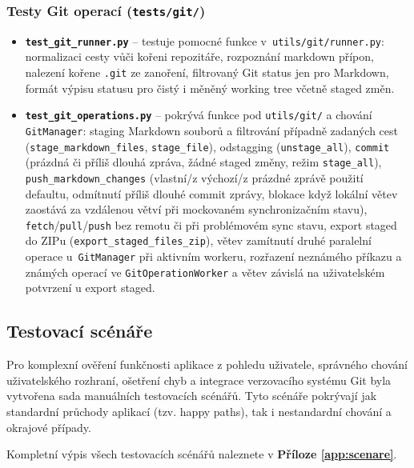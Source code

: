 \documentclass[12pt, a4paper]{article}
\begin{document}
\subsubsection*{Testy Git operací (\texttt{tests/git/})}

\begin{itemize}
    \item \textbf{\texttt{test\_git\_runner.py}} --
    testuje pomocné funkce v~\texttt{utils/git/runner.py}: normalizaci cesty vůči kořeni repozitáře,
    rozpoznání markdown přípon, nalezení kořene \texttt{.git} ze zanoření, filtrovaný Git status jen pro Markdown,
    formát výpisu statusu pro čistý i měněný working tree včetně staged změn.

    \item \textbf{\texttt{test\_git\_operations.py}} --
    pokrývá funkce pod \texttt{utils/git/} a chování \texttt{GitManager}: staging Markdown souborů
    a filtrování případně zadaných cest (\texttt{stage\_markdown\_files}, \texttt{stage\_file}),
    odstagging (\texttt{unstage\_all}), \texttt{commit} (prázdná či příliš dlouhá zpráva,
    žádné staged změny, režim \texttt{stage\_all}),
    \texttt{push\_markdown\_changes} (vlastní/z výchozí/z prázdné zprávě použití defaultu,
    odmítnutí příliš dlouhé commit zprávy, blokace když lokální větev zaostává za vzdálenou větví při mockovaném synchronizačním stavu),
    \texttt{fetch}/\texttt{pull}/\texttt{push} bez remotu či při problémovém sync stavu,
    export staged do ZIPu (\texttt{export\_staged\_files\_zip}), větev zamítnutí druhé paralelní operace
    u~\texttt{GitManager} při aktivním workeru,
    rozřazení neznámého příkazu a známých operací ve \texttt{GitOperationWorker}
    a větev závislá na uživatelském potvrzení u export staged.
\end{itemize}

\subsection{Testovací scénáře}

Pro komplexní ověření funkčnosti aplikace z pohledu uživatele, 
správného chování uživatelského rozhraní, ošetření chyb a integrace 
verzovacího systému Git byla vytvořena sada manuálních testovacích scénářů. 
Tyto scénáře pokrývají jak standardní průchody aplikací (tzv. happy paths), 
tak i nestandardní chování a okrajové případy. 

Kompletní výpis všech testovacích scénářů naleznete v \textbf{Příloze \ref{app:scenare}}.
\end{document}
